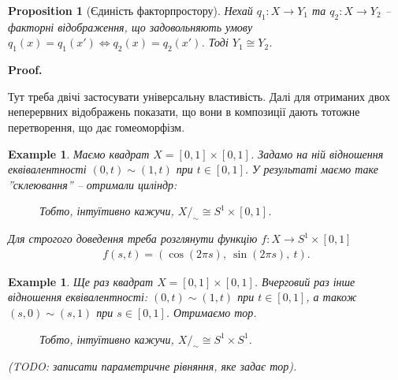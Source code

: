 \documentclass[a4paper, 10pt]{article}
\makeatletter
\theoremstyle{theoremdd}
\newtheorem{example}[theorem]{Example}
\newtheorem{proposition}[theorem]{Proposition}
\renewenvironment{proof}[1][Proof.\\]{\par
\pushQED{\hfill \qed}%
\normalfont \topsep6\p@\@plus6\p@\relax
\trivlist
\item\relax
{\bfseries
#1\@addpunct{.}}\hspace\labelsep\ignorespaces
}{%
\popQED\endtrivlist\@endpefalse
}
\makeatother
\begin{document}
\begin{proposition}[Єдиність факторпростору]
Нехай $q_1 \colon X \to Y_1$ та $q_2 \colon X \to Y_2$ -- факторні відображення, що задовольняють умову $q_1(x) = q_1(x') \iff q_2(x) = q_2(x')$. Тоді $Y_1 \cong Y_2$.
\end{proposition}

\begin{proof}
Тут треба двічі застосувати універсальну властивість. Далі для отриманих двох неперервних відображень показати, що вони в композиції дають тотожне перетворення, що дає гомеоморфізм.
\end{proof}

\begin{example}
Маємо квадрат $X = [0,1] \times [0,1]$. Задамо на ній відношення еквівалентності $(0,t) \sim (1,t)$ при $t \in [0,1]$. У результаті маємо таке ''склеювання'' -- отримали циліндр:
\begin{figure}[H]
\centering
{}
\qquad
{}
\caption*{Тобто, інтуїтивно кажучи, $X/_{\sim} \cong S^1 \times [0,1]$.}
\end{figure}
\noindent
Для строгого доведення треба розглянути функцію $f \colon X \to S^1 \times [0,1]$
\begin{align*}
f(s,t) = (\cos (2\pi s),\ \sin(2\pi s),\ t).
\end{align*}
\end{example}

\begin{example}
Ще раз квадрат $X = [0,1] \times [0,1]$. Вчерговий раз інше відношення еквівалентності: $(0,t) \sim (1,t)$ при $t \in [0,1]$, а також $(s,0) \sim (s,1)$ при $s \in [0,1]$. Отримаємо тор.
\begin{figure}[H]
\centering
{}
\qquad
{}
\caption*{Тобто, інтуїтивно кажучи, $X/_{\sim} \cong S^1 \times S^1$.}
\end{figure}
\noindent
(TODO: записати параметричне рівняння, яке задає тор).
\end{example}
\end{document}
